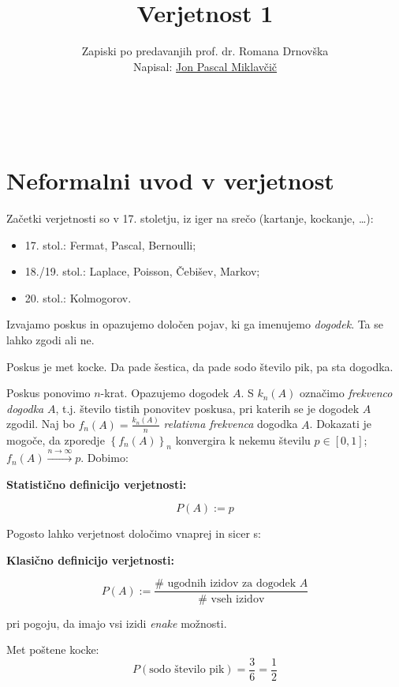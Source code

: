 \documentclass[12pt]{book}
\title{\Huge Verjetnost 1}
\author{\small Zapiski po predavanjih prof. dr. Romana Drnovška \\ Napisal: \href{https://github.com/jonpascal/VER1-zapiski-predavanj}{Jon Pascal Miklavčič}}
\date{\filemodprintdate{\jobname}}
\makeatletter
\renewcommand{\maketitle}{
  \begin{titlepage}
    \begin{center}
      \vspace*{25mm} 
      \Huge\@title\par 
      \vspace{20mm} 
      \large\@author \\
      \vspace{140mm} 
      \large\@date\par 
    \end{center}
  \end{titlepage}
}
\def\n{\noindent}
\theoremstyle{definition}
\theoremstyle{plain}
\theoremstyle{plain}
\theoremstyle{plain}
\theoremstyle{remark}
\makeatother
\begin{document}
\frontmatter

\maketitle

\tableofcontents

\mainmatter

\chapter{Neformalni uvod v verjetnost}

Začetki verjetnosti so v 17. stoletju, iz iger na srečo (kartanje, kockanje, \dots): 
\begin{itemize}
    \item 17. stol.: Fermat, Pascal, Bernoulli;
    \item 18./19. stol.: Laplace, Poisson, Čebišev, Markov;
    \item 20. stol.: Kolmogorov.
\end{itemize}

\n Izvajamo poskus in opazujemo določen pojav, ki ga imenujemo \emph{dogodek}. Ta se lahko zgodi ali ne. 

\begin{zgled}
    Poskus je met kocke. Da pade šestica, da pade sodo število pik, pa sta dogodka.
\end{zgled}

\n Poskus ponovimo $n$-krat. Opazujemo dogodek $A$. S $k_n(A)$ označimo \emph{frekvenco dogodka} $A$, t.j. število tistih ponovitev poskusa, pri katerih se je dogodek $A$ zgodil. Naj bo $f_n(A)=\frac{k_n(A)}{n}$ \emph{relativna frekvenca} dogodka $A$. Dokazati je mogoče, da zporedje $\left\{f_n(A)\right\}_n$ konvergira k nekemu številu $p \in [0, 1]$; $f_n(A) \xrightarrow{n \to \infty} p$. Dobimo:

\textbf{Statistično definicijo verjetnosti:}

$$
P(A):= p 
$$

\n Pogosto lahko verjetnost določimo vnaprej in sicer s: 

\textbf{Klasično definicijo verjetnosti:}

$$
P(A):= \frac{\# \text{ ugodnih izidov za dogodek } A}{\# \text{ vseh izidov}}
$$

pri pogoju, da imajo vsi izidi \emph{enake} možnosti.

\begin{zgled}
    Met poštene kocke: 
    $$
    P(\text{sodo število pik}) = \frac{3}{6} = \frac{1}{2}
    $$
\end{zgled}
\end{document}
